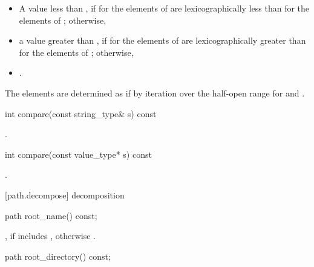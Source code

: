 \begin{itemdescr}
\pnum
\returns
 \begin{itemize}
\item A value less than ,
  if  for the elements of 
  are lexicographically less than  for the elements of ;
  otherwise,
\item a value greater than ,
  if  for the elements of 
  are lexicographically greater than  for the elements of ;
  otherwise,
\item {}.
 \end{itemize}

\pnum
\remarks The elements are determined as if by iteration over the half-open
range  for  and .
\end{itemdescr}

\begin{itemdecl}
int compare(const string_type& s) const
\end{itemdecl}

\begin{itemdescr}
\pnum
\returns {}.
\end{itemdescr}

\begin{itemdecl}
int compare(const value_type* s) const
\end{itemdecl}

\begin{itemdescr}
\pnum
\returns {}.
\end{itemdescr}

[path.decompose]{ decomposition}

\begin{itemdecl}
path root_name() const;
\end{itemdecl}

\begin{itemdescr}
\pnum
\returns {}, if  includes , otherwise .
\end{itemdescr}

\begin{itemdecl}
path root_directory() const;
\end{itemdecl}

